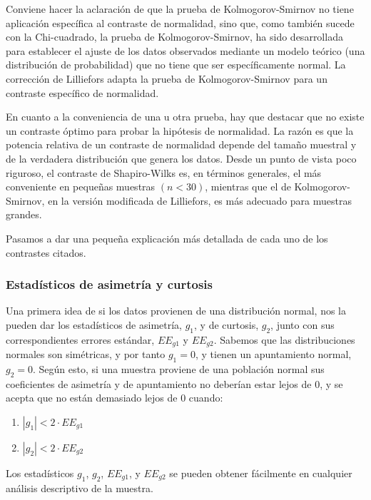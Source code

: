 \begin{description}
Conviene hacer la aclaración de que la prueba de Kolmogorov-Smirnov no tiene aplicación específica al contraste de normalidad,
sino que, como también sucede con la Chi-cuadrado, la prueba de Kolmogorov-Smirnov, ha sido desarrollada para establecer el ajuste de los datos observados mediante un modelo teórico (una distribución de probabilidad) que no tiene que ser específicamente
normal. La corrección de Lilliefors adapta la prueba de Kolmogorov-Smirnov para un contraste específico de normalidad.

En cuanto a la conveniencia de una u otra prueba, hay que destacar que
no existe un contraste óptimo para probar la hipótesis de
normalidad. La razón es que la potencia relativa de un contraste
de normalidad depende del tamaño muestral y de la verdadera
distribución que genera los datos. Desde un punto de vista poco
riguroso, el contraste de Shapiro-Wilks es, en términos
generales, el más conveniente en pequeñas muestras $(n<30)$,
mientras que el de Kolmogorov-Smirnov, en la versión modificada de
Lilliefors, es más adecuado para muestras grandes.

Pasamos a dar una pequeña explicación más detallada de cada uno de
los contrastes citados.


\subsubsection{Estadísticos de asimetría y curtosis}
Una primera idea de si los datos provienen de una distribución
normal, nos la pueden dar los estadísticos de asimetría, $g_1$, y
de curtosis, $g_2$, junto con sus correspondientes errores estándar, $EE_{g1}$ y $EE_{g2}$.
Sabemos que las distribuciones normales son
simétricas, y por tanto $g_1=0$, y tienen un apuntamiento normal,
$g_2=0$. Según esto, si una muestra proviene de una población
normal sus coeficientes de asimetría y de apuntamiento no deberían
estar lejos de 0, y se acepta que no están demasiado lejos de 0 cuando:
\begin{enumerate}
\item $|g_1|<2\cdot EE_{g1}$
\item $|g_2|<2\cdot EE_{g2}$
\end{enumerate}
Los estadísticos $g_1$, $g_2$, $EE_{g1}$, y $EE_{g2}$ se pueden obtener fácilmente en cualquier análisis descriptivo de la muestra.



\end{description}
